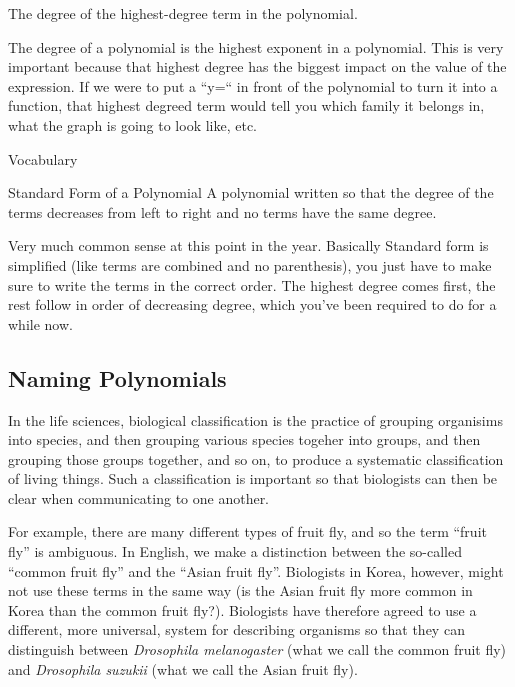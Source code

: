 \begin{boxeddef}
The degree of the highest-degree term in the polynomial.
\end{boxeddef}

The degree of a polynomial is the highest exponent in a polynomial. This is very important because that highest degree has the biggest impact on the value of the expression. If we were to put a ``y=`` in front of the polynomial to turn it into a function, that highest degreed term would tell you which family it belongs in, what the graph is going to look like, etc.



Vocabulary

Standard Form of a Polynomial
A polynomial written so that the degree of the terms decreases from left to right and no terms have the same degree.
 
Very much common sense at this point in the year. Basically Standard form is simplified (like terms are combined and no parenthesis), you just have to make sure to write the terms in the correct order. The highest degree comes first, the rest follow in order of decreasing degree, which you've been required to do for a while now.



\subsection{Naming Polynomials}

In the life sciences, biological classification is the practice of grouping organisims into species, and then grouping various species togeher into groups, and then grouping those groups together, and so on, to produce a systematic classification of living things. Such a classification is important so that biologists can then be clear when communicating to one another.

For example, there are many different types of fruit fly, and so the term ``fruit fly'' is ambiguous. In English, we make a distinction between the so-called ``common fruit fly'' and the ``Asian fruit fly''. Biologists in Korea, however, might not use these terms in the same way (is the Asian fruit fly more common in Korea than the common fruit fly?). Biologists have therefore agreed to use a different, more universal, system for describing organisms so that they can distinguish between \textit{Drosophila melanogaster} (what we call the common fruit fly) and \textit{Drosophila suzukii} (what we call the Asian fruit fly).

